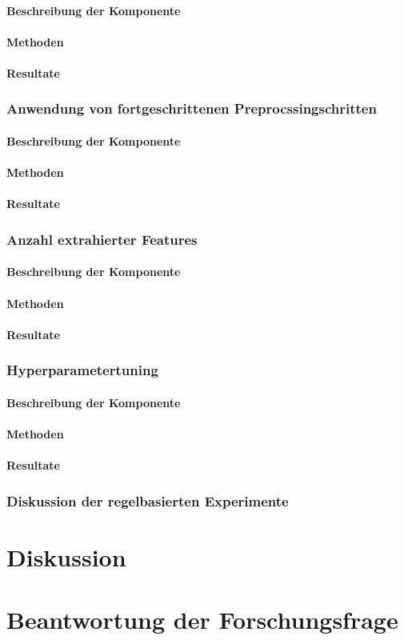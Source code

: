 \paragraph{Beschreibung der Komponente}
\paragraph{Methoden}
\paragraph{Resultate}
\subsubsection{Anwendung von fortgeschrittenen Preprocssingschritten}
\paragraph{Beschreibung der Komponente}
\paragraph{Methoden}
\paragraph{Resultate}
\subsubsection{Anzahl extrahierter Features}
\paragraph{Beschreibung der Komponente}
\paragraph{Methoden}
\paragraph{Resultate}
\subsubsection{Hyperparametertuning}
\paragraph{Beschreibung der Komponente}
\paragraph{Methoden}
\paragraph{Resultate}
\subsubsection{Diskussion der regelbasierten Experimente}
\section{Diskussion}
\section{Beantwortung der Forschungsfrage}